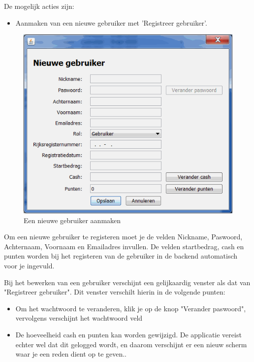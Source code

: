 De mogelijk acties zijn:
\begin{itemize}
\item{Aanmaken van een nieuwe gebruiker met 'Registreer gebruiker'.}
\end{itemize}

\begin{figure}[h!]
	\centering
		\includegraphics[width=\textwidth]{images/handleiding/handleiding4.png}
	\caption{Een nieuwe gebruiker aanmaken}
\end{figure}

Om een nieuwe gebruiker te registeren moet je de velden Nickname, Paswoord, Achternaam, Voornaam en Emailadres invullen. 
De velden startbedrag, cash en punten worden bij het registeren van de gebruiker in de backend automatisch voor je ingevuld.

Bij het bewerken van een gebruiker verschijnt een gelijkaardig venster als dat van "Registreer gebruiker".
Dit venster verschilt hierin in de volgende punten:

\begin{itemize}
\item{Om het wachtwoord te veranderen, klik je op de knop "Verander paswoord", vervolgens verschijnt het wachtwoord veld}
\item{De hoeveelheid cash en punten kan worden gewijzigd. De applicatie vereist echter wel dat dit gelogged wordt, en daarom verschijnt er een nieuw scherm waar je een reden dient op te geven..}
\end{itemize}


